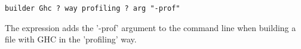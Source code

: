 \begin{lstlisting}
builder Ghc ? way profiling ? arg "-prof"
\end{lstlisting}

\noindent The expression adds the \lst'-prof' argument to the command line when
building a file with GHC in the \lst'profiling' way.

\newcommand{\itab}[1]{\hspace{0em}\rlap{#1}}
\newcommand{\tab}[1]{\hspace{.1\textwidth}\rlap{#1}}
\newcommand{\ctab}[1]{\hspace{.031\textwidth}\rlap{#1}}
\newcommand{\ptab}[1]{\hspace{.074\textwidth}\rlap{#1}}
\newcommand{\cotab}[1]{\hspace{.064\textwidth}\rlap{#1}}
\newcommand{\ttab}[1]{\hspace{.058\textwidth}\rlap{#1}}
\newcommand{\tytab}[1]{\hspace{.052\textwidth}\rlap{#1}}
\newcommand{\atab}[1]{\hspace{.102\textwidth}\rlap{#1}}

